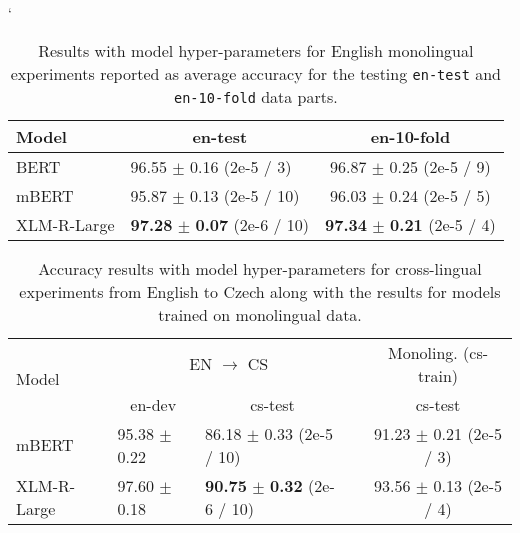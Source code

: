 \documentclass[10pt, a4paper]{article}
\begin{document}
\begin{table}[H]
\catcode`
\begin{adjustbox}{width=1\linewidth,center}
\begin{tabular}{llc} \toprule
Model                  & \multicolumn{1}{c}{en-test} & \multicolumn{1}{c}{en-10-fold} \\ \midrule
BERT             & 96.55 $\pm$ 0.16 \footnotesize{(2e-5 / 3)}                & 96.87 $\pm$ 0.25 \footnotesize{(2e-5 / 9)}             \\
mBERT            & 95.87 $\pm$ 0.13 \footnotesize{(2e-5 / 10)}                & 96.03 $\pm$ 0.24 \footnotesize{(2e-5 / 5)}             \\
XLM-R-Large            & \textbf{97.28} $\pm$ \textbf{0.07} \footnotesize{(2e-6 / 10)}                 & \textbf{97.34} $\pm$ \textbf{0.21} \footnotesize{(2e-5 / 4)}              \\ \bottomrule                     
\end{tabular}
\end{adjustbox}
\caption{Results with model hyper-parameters for English monolingual experiments reported as average accuracy for the testing \texttt{en-test} and \texttt{en-10-fold} data parts.} \label{tab:hyper-monolingual-en}
\end{table}

\begin{table}[H]
\begin{adjustbox}{width=1\linewidth,center}
\begin{tabular}{lllcc} \toprule
\multirow{2}{*}{Model}            & \multicolumn{2}{c}{EN $\rightarrow$ CS} & &  \multicolumn{1}{c}{ Monoling. (cs-train)}  \\ \cline{2-3} \cline{5-5} 
        & \multicolumn{1}{c}{en-dev}           & \multicolumn{1}{c}{cs-test} & & \multicolumn{1}{c}{cs-test}       \\ \midrule
mBERT & 95.38 $\pm$ 0.22     & 86.18 $\pm$ 0.33 \footnotesize{(2e-5 / 10)}   &   & 91.23 $\pm$ 0.21 \footnotesize{(2e-5 / 3)} \\
XLM-R-Large & 97.60 $\pm$ 0.18     & \textbf{90.75} $\pm$ \textbf{0.32} \footnotesize{(2e-6 / 10)}  &  & 93.56 $\pm$ 0.13 \footnotesize{(2e-5 / 4)} \\ \bottomrule
\end{tabular}
\end{adjustbox}
\caption{Accuracy results with model hyper-parameters for cross-lingual experiments from English to Czech along with the results for models trained on monolingual data.} \label{tab:hyper-crosslingual-en-cs}
\end{table}
\end{document}
